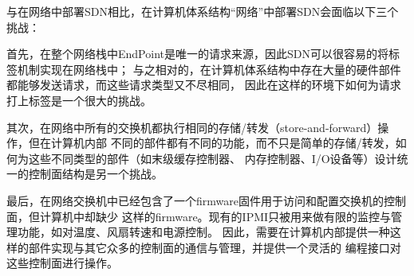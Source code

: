与在网络中部署SDN相比，在计算机体系结构``网络''中部署SDN会面临以下三个挑战：

首先，在整个网络栈中EndPoint是唯一的请求来源，因此SDN可以很容易的将标签机制实现在网络栈中；
与之相对的，在计算机体系结构中存在大量的硬件部件都能够发送请求，而这些请求类型又不尽相同，
因此在这样的环境下如何为请求打上标签是一个很大的挑战。

其次，在网络中所有的交换机都执行相同的存储/转发（store-and-forward）操作，但在计算机内部
不同的部件都有不同的功能，而不只是简单的存储/转发，如何为这些不同类型的部件（如末级缓存控制器、
内存控制器、I/O设备等）设计统一的控制面结构是另一个挑战。

最后，在网络交换机中已经包含了一个firmware固件用于访问和配置交换机的控制面，但计算机中却缺少
这样的firmware。现有的IPMI只被用来做有限的监控与管理功能，如对温度、风扇转速和电源控制。
因此，需要在计算机内部提供一种这样的部件实现与其它众多的控制面的通信与管理，并提供一个灵活的
编程接口对这些控制面进行操作。

\fi
